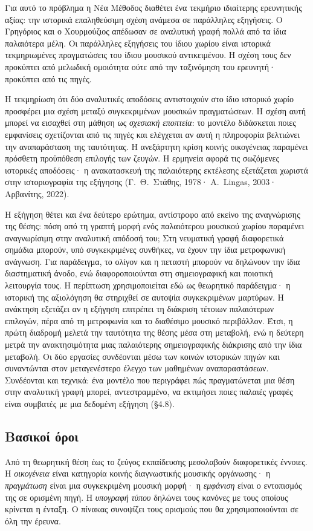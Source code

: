 \documentclass[11pt,a4paper]{article}
\begin{document}
Για αυτό το πρόβλημα η Νέα Μέθοδος διαθέτει ένα τεκμήριο ιδιαίτερης ερευνητικής αξίας: την ιστορικά επαληθεύσιμη σχέση ανάμεσα σε παράλληλες εξηγήσεις. Ο Γρηγόριος και ο Χουρμούζιος απέδωσαν σε αναλυτική γραφή πολλά από τα ίδια παλαιότερα μέλη. Οι παράλληλες εξηγήσεις του ίδιου χωρίου είναι ιστορικά τεκμηριωμένες πραγματώσεις του ίδιου μουσικού αντικειμένου. Η σχέση τους δεν προκύπτει από μελωδική ομοιότητα ούτε από την ταξινόμηση του ερευνητή· προκύπτει από τις πηγές.

Η τεκμηρίωση ότι δύο αναλυτικές αποδόσεις αντιστοιχούν στο ίδιο ιστορικό χωρίο προσφέρει μια σχέση μεταξύ συγκεκριμένων μουσικών πραγματώσεων. Η σχέση αυτή μπορεί να εισαχθεί στη μάθηση ως \emph{σχεσιακή εποπτεία}: το μοντέλο διδάσκεται ποιες εμφανίσεις σχετίζονται από τις πηγές και ελέγχεται αν αυτή η πληροφορία βελτιώνει την αναπαράσταση της ταυτότητας. Η ανεξάρτητη κρίση κοινής οικογένειας παραμένει πρόσθετη προϋπόθεση επιλογής των ζευγών. Η ερμηνεία αφορά τις σωζόμενες ιστορικές αποδόσεις· η ανακατασκευή της παλαιότερης εκτέλεσης εξετάζεται χωριστά στην ιστοριογραφία της εξήγησης (Γ.~Θ.~Στάθης, 1978· A.~Lingas, 2003· Αρβανίτης, 2022).

Η εξήγηση θέτει και ένα δεύτερο ερώτημα, αντίστροφο από εκείνο της αναγνώρισης της θέσης: πόση από τη γραπτή μορφή ενός παλαιότερου μουσικού χωρίου παραμένει αναγνωρίσιμη στην αναλυτική απόδοσή του; Στη νευματική γραφή διαφορετικά σημάδια μπορούν, υπό συγκεκριμένες συνθήκες, να έχουν την ίδια μετροφωνική ανάγνωση. Για παράδειγμα, το ολίγον και η πεταστή μπορούν να δηλώνουν την ίδια διαστηματική άνοδο, ενώ διαφοροποιούνται στη σημειογραφική και ποιοτική λειτουργία τους. Η περίπτωση χρησιμοποιείται εδώ ως θεωρητικό παράδειγμα· η ιστορική της αξιολόγηση θα στηριχθεί σε αυτοψία συγκεκριμένων μαρτύρων. Η ανάκτηση εξετάζει αν η εξήγηση επιτρέπει τη διάκριση τέτοιων παλαιότερων επιλογών, πέρα από τη μετροφωνία και το διαθέσιμο μουσικό περιβάλλον. Έτσι, η πρώτη διαδρομή μελετά την ταυτότητα της θέσης μέσα στη μεταβολή, ενώ η δεύτερη μετρά την ανακτησιμότητα μιας παλαιότερης σημειογραφικής διάκρισης από την ίδια μεταβολή. Οι δύο εργασίες συνδέονται μέσω των κοινών ιστορικών πηγών και συναντώνται στον μεταγενέστερο έλεγχο των μαθημένων αναπαραστάσεων. Συνδέονται και τεχνικά: ένα μοντέλο που περιγράφει πώς πραγματώνεται μια θέση στην αναλυτική γραφή μπορεί, αντεστραμμένο, να εκτιμήσει ποιες παλαιές γραφές είναι συμβατές με μια δεδομένη εξήγηση (§4.8).

\subsection{Βασικοί όροι}
Από τη θεωρητική θέση έως το ζεύγος εκπαίδευσης μεσολαβούν διαφορετικές έννοιες. Η \emph{οικογένεια} είναι κατηγορία κοινής διαγνωστικής μουσικής οργάνωσης· η \emph{πραγμάτωση} είναι μια συγκεκριμένη μουσική μορφή· η \emph{εμφάνιση} είναι ο εντοπισμός της σε ορισμένη πηγή. Η \emph{υπογραφή τύπου} δηλώνει τους κανόνες με τους οποίους κρίνεται η ένταξη. Ο πίνακας συνοψίζει τους ορισμούς που θα χρησιμοποιούνται σε όλη την έρευνα.
\end{document}
